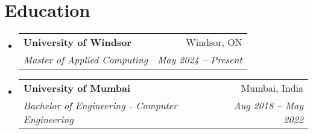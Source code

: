 \documentclass[letterpaper,11pt]{article}
\makeatletter
\newcommand{\resumeSubheading}[4]{
  \vspace{-2pt}\item
    \begin{tabular*}{0.97\textwidth}[t]{l@{\extracolsep{\fill}}r}
      \textbf{#1} & #2 \\
      \textit{\small#3} & \textit{\small #4} \\
    \end{tabular*}\vspace{-7pt}
}
\newcommand{\resumeSubHeadingListStart}{\begin{itemize}[leftmargin=0.15in, label={}]}
\newcommand{\resumeSubHeadingListEnd}{\end{itemize}}
\makeatother
\begin{document}
%

\section{Education}
  \resumeSubHeadingListStart
    \resumeSubheading
      {University of Windsor}{Windsor, ON}
      {Master of Applied Computing}{May 2024 -- Present}
    \resumeSubheading
      {University of Mumbai}{Mumbai, India}
      {Bachelor of Engineering - Computer Engineering}{Aug 2018 -- May 2022}
  \resumeSubHeadingListEnd

\end{document}

